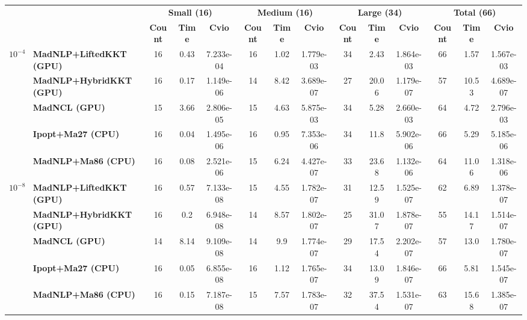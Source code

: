 \begin{center}
\renewcommand{\arraystretch}{0.9}
\begin{tabular}{|l|l|ccc|ccc|ccc|ccc|}
\hline
 & & \multicolumn{3}{c|}{\textbf{Small (16)}} & \multicolumn{3}{c|}{\textbf{Medium (16)}} & \multicolumn{3}{c|}{\textbf{Large (34)}} & \multicolumn{3}{c|}{\textbf{Total (66)}} \\
 & & \textbf{Count} & \textbf{Time} & \textbf{Cvio} & \textbf{Count} & \textbf{Time} & \textbf{Cvio} & \textbf{Count} & \textbf{Time} & \textbf{Cvio} & \textbf{Count} & \textbf{Time} & \textbf{Cvio}\\
\hline
\multirow{5}{*}{\Large\textbf{$10^{-4}$}} & \textbf{MadNLP+LiftedKKT (GPU)} & \cellcolor{blue!15}16 & 0.43 & 7.233e-04 & \cellcolor{blue!15}16 & 1.02 & 1.779e-03 & \cellcolor{blue!15}34 & \cellcolor{blue!15}2.43 & 1.864e-03 & \cellcolor{blue!15}66 & \cellcolor{blue!15}1.57 & 1.567e-03 \\
 & \textbf{MadNLP+HybridKKT (GPU)} & \cellcolor{blue!15}16 & 0.17 & \cellcolor{blue!15}1.149e-06 & 14 & 8.42 & \cellcolor{blue!15}3.689e-07 & 27 & 20.06 & \cellcolor{blue!15}1.179e-07 & 57 & 10.53 & \cellcolor{blue!15}4.689e-07 \\
 & \textbf{MadNCL (GPU)} & 15 & 3.66 & 2.806e-05 & 15 & 4.63 & 5.875e-03 & \cellcolor{blue!15}34 & 5.28 & 2.660e-03 & 64 & 4.72 & 2.796e-03 \\
 & \textbf{Ipopt+Ma27 (CPU)} & \cellcolor{blue!15}16 & \cellcolor{blue!15}0.04 & 1.495e-06 & \cellcolor{blue!15}16 & \cellcolor{blue!15}0.95 & 7.353e-06 & \cellcolor{blue!15}34 & 11.8 & 5.902e-06 & \cellcolor{blue!15}66 & 5.29 & 5.185e-06 \\
 & \textbf{MadNLP+Ma86 (CPU)} & \cellcolor{blue!15}16 & 0.08 & 2.521e-06 & 15 & 6.24 & 4.427e-07 & 33 & 23.68 & 1.132e-06 & 64 & 11.06 & 1.318e-06 \\
\hline
\multirow{5}{*}{\Large\textbf{$10^{-8}$}} & \textbf{MadNLP+LiftedKKT (GPU)} & \cellcolor{blue!15}16 & 0.57 & 7.133e-08 & 15 & 4.55 & 1.782e-07 & 31 & \cellcolor{blue!15}12.59 & \cellcolor{blue!15}1.525e-07 & 62 & 6.89 & \cellcolor{blue!15}1.378e-07 \\
 & \textbf{MadNLP+HybridKKT (GPU)} & \cellcolor{blue!15}16 & 0.2 & 6.948e-08 & 14 & 8.57 & 1.802e-07 & 25 & 31.07 & 1.878e-07 & 55 & 14.17 & 1.514e-07 \\
 & \textbf{MadNCL (GPU)} & 14 & 8.14 & 9.109e-08 & 14 & 9.9 & 1.774e-07 & 29 & 17.54 & 2.202e-07 & 57 & 13.0 & 1.780e-07 \\
 & \textbf{Ipopt+Ma27 (CPU)} & \cellcolor{blue!15}16 & \cellcolor{blue!15}0.05 & \cellcolor{blue!15}6.855e-08 & \cellcolor{blue!15}16 & \cellcolor{blue!15}1.12 & \cellcolor{blue!15}1.765e-07 & \cellcolor{blue!15}34 & 13.09 & 1.846e-07 & \cellcolor{blue!15}66 & \cellcolor{blue!15}5.81 & 1.545e-07 \\
 & \textbf{MadNLP+Ma86 (CPU)} & \cellcolor{blue!15}16 & 0.15 & 7.187e-08 & 15 & 7.57 & 1.783e-07 & 32 & 37.54 & 1.531e-07 & 63 & 15.68 & 1.385e-07 \\
\hline
\end{tabular}
\end{center}
